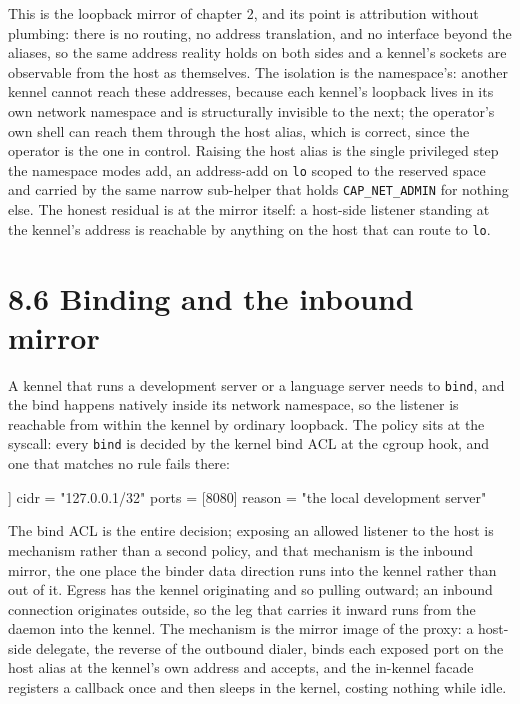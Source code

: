 This is the loopback mirror of chapter 2, and its point is attribution
without plumbing: there is no routing, no address translation, and no
interface beyond the aliases, so the same address reality holds on both
sides and a kennel's sockets are observable from the host as themselves.
The isolation is the namespace's: another kennel cannot reach these
addresses, because each kennel's loopback lives in its own network
namespace and is structurally invisible to the next; the operator's own
shell can reach them through the host alias, which is correct, since the
operator is the one in control. Raising the host alias is the single
privileged step the namespace modes add, an address-add on \texttt{lo}
scoped to the reserved space and carried by the same narrow sub-helper
that holds \texttt{CAP\_NET\_ADMIN} for nothing else. The honest
residual is at the mirror itself: a host-side listener standing at the
kennel's address is reachable by anything on the host that can route to
\texttt{lo}.

\hypertarget{binding-and-the-inbound-mirror}{%
\section{8.6 Binding and the inbound
mirror}\label{binding-and-the-inbound-mirror}}

A kennel that runs a development server or a language server needs to
\texttt{bind}, and the bind happens natively inside its network
namespace, so the listener is reachable from within the kennel by
ordinary loopback. The policy sits at the syscall: every \texttt{bind}
is decided by the kernel bind ACL at the cgroup hook, and one that
matches no rule fails there:

\begin{kennelcode}
[[net.bpf.bind.allow]]
cidr   = "127.0.0.1/32"
ports  = [8080]
reason = "the local development server"
\end{kennelcode}

The bind ACL is the entire decision; exposing an allowed listener to the
host is mechanism rather than a second policy, and that mechanism is the
inbound mirror, the one place the binder data direction runs into the
kennel rather than out of it. Egress has the kennel originating and so
pulling outward; an inbound connection originates outside, so the leg
that carries it inward runs from the daemon into the kennel. The
mechanism is the mirror image of the proxy: a host-side delegate, the
reverse of the outbound dialer, binds each exposed port on the host
alias at the kennel's own address and accepts, and the in-kennel facade
registers a callback once and then sleeps in the kernel, costing nothing
while idle.

